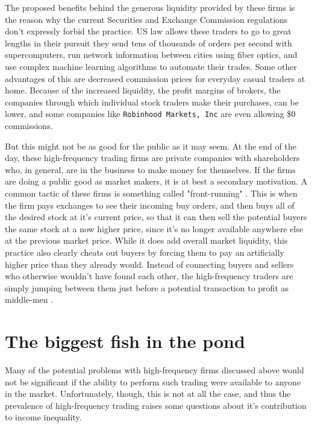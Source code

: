 \documentclass[12pt,oneside,reqno]{amsart}
\theoremstyle{plain}
\theoremstyle{definition}
\theoremstyle{remark}
\newcommand{\inlinecode}{\texttt}
\begin{document}
The proposed benefits behind the generous liquidity provided by these firms is the reason why the current Securities and Exchange Commission regulations don't expressly forbid the practice. US law allows these traders to go to great lengths in their pursuit they send tens of thousands of orders per second with supercomputers, run network information between cities using fiber optics, and use complex machine learning algorithms to automate their trades. Some other advantages of this are decreased commission prices for everyday casual traders at home. Because of the increased liquidity, the profit margins of brokers, the companies through which individual stock traders make their purchases, can be lower, and some companies like \inlinecode{Robinhood Markets, Inc} are even allowing \$0 commissions. 

But this might not be as good for the public as it may seem. At the end of the day, these high-frequency trading firms are private companies with shareholders who, in general, are in the business to make money for themselves. If the firms are doing a public good as market makers, it is at best a secondary motivation. A common tactic of these firms is something called "front-running" \cite{o'brien_2014}. This is when the firm pays exchanges to see their incoming buy orders, and then buys all of the desired stock at it's current price, so that it can then sell the potential buyers the same stock at a now higher price, since it's no longer available anywhere else at the previous market price. While it does add overall market liquidity, this practice also clearly cheats out buyers by forcing them to pay an artificially higher price than they already would. Instead of connecting buyers and sellers who otherwise wouldn't have found each other, the high-frequency traders are simply jumping between them just before a potential transaction to profit as middle-men \cite{o'brien_2014}. 

\section{The biggest fish in the pond}

Many of the potential problems with high-frequency firms discussed above would not be significant if the ability to perform such trading were available to anyone in the market. Unfortunately, though, this is not at all the case, and thus the prevalence of high-frequency trading raises some questions about it's contribution to income inequality. 
\end{document}
